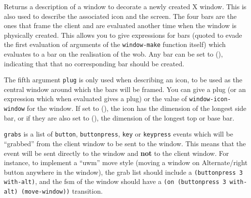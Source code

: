 \centerline{}

Returns a description of a {\GWM} window to decorate a newly created X
window. This is also used to describe the associated icon and the screen.
The four bars are the ones that frame the client and are evaluated
another time when the window is physically created. This allows you to give
expressions for bars (quoted to evade the first evaluation of arguments of
the \verb"window-make" function itself) which evaluates to a bar on the
realisation of the wob.  Any bar can be set to (), indicating that that no
corresponding bar should be created.

The fifth argument \verb"plug" is only used when describing an icon, 
to be used as the central window
around which the bars will be framed. You can give a plug (or an expression
which when evaluated gives a plug) or the value of
\verb"window-icon-window" for the window. 
If set to (), the icon has
the dimension of the longest side bar, or if they are also set to (), the
dimension of the longest top or base bar.

\centerline{}


\verb"grabs" is a list of \verb"button", \verb"buttonpress", \verb"key" or
\verb"keypress"  events which will be ``grabbed'' from the client window to
be sent to the {\GWM} window. This means that the event will be sent
directly to the {\GWM} window and {\bf not} to the client window.  For
instance, to implement a ``uwm'' move style (moving a window on
Alternate/right button anywhere in the window), the grab list should include
a \verb"(buttonpress 3 with-alt)", and the fsm of the window should have a
\verb"(on (buttonpress 3 with-alt) (move-window))" transition.

